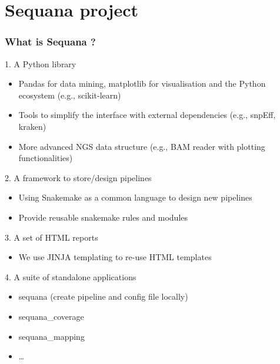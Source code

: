 \documentclass{beamer}
\begin{document}
\section{Sequana project}

\begin{frame}
    \frametitle{What is Sequana ?}
    \begin{block}{1. A Python library}
       \tiny
    \begin{itemize}
        \item Pandas for data mining, matplotlib for visualisation and the Python ecosystem (e.g., scikit-learn)
        \item Tools to simplify the interface with external dependencies (e.g., snpEff, kraken)
        \item More advanced NGS data structure (e.g., BAM reader with plotting functionalities)
    \end{itemize} 
    \end{block}
    \pause
    
    \begin{exampleblock}{2. A framework to store/design pipelines}
    \tiny
    \begin{itemize}
        \item Using Snakemake as a common language to design new pipelines
        \item Provide reusable snakemake rules and modules
    \end{itemize} 
     \end{exampleblock}
  \pause
  
    \begin{block}{3. A set of HTML reports}
    \tiny
    \begin{itemize}
	\item We use JINJA templating to re-use HTML templates
    \end{itemize} 
    \end{block}
  \pause  
    \begin{block}{4. A suite of standalone applications}
    \tiny
    \begin{itemize}
	\item sequana (create pipeline and config file locally)
	\item sequana\_coverage
	\item sequana\_mapping
	\item \dots
    \end{itemize} 
    \end{block}
\end{frame}
\end{document}
